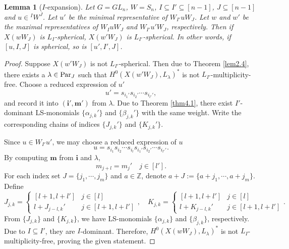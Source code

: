 \documentclass[12pt]{amsart}
\newtheorem{lemma}[theorem]{Lemma}
\theoremstyle{definition}
\theoremstyle{remark}
\newcommand{\Z}{\mathbb{Z}}
\newcommand{\Parj}{{\rm Par}_J}
\begin{document}
\begin{lemma}[$I$-expansion]\label{lem4.4}
Let $G = GL_n$, $W=S_n$, $I \subseteq I' \subseteq [n-1]$, $J \subseteq [n-1]$ and $u \in {}^I W^J$. Let $u'$ be the minimal representative of $W_{I'} u W_J$. Let $w$ and $w'$ be the maximal representatives of $W_I u W_J$ and $W_{I'} u' W_J$, respectively. Then if $X(wW_J)$ is $L_I$-spherical, $X(w'W_J)$ is $L_{I'}$-spherical. In other words, if $[u,I,J]$ is spherical, so is $[u',I',J]$.
\end{lemma}

\begin{proof}
Suppose $X(w'W_J)$ is not $L_{I'}$-spherical. Then due to Theorem \ref{lem2.4}, there exists a $\lambda \in \Parj$ such that $H^0(X(w'W_J),L_\lambda)^*$ is not $L_{I'}$-multiplicity-free. Choose a reduced expression of $u'$ 
\begin{equation}\label{eqn4.34}
u' = s_{i_1'} s_{i_2'} \cdots s_{i_{l'}'},
\end{equation}
and record it into $(\mathbf{i'}, \mathbf{m'})$ from $\lambda$. Due to Theorem \ref{thm4.1}, there exist $I'$-dominant LS-monomials $\{\alpha_{j,k}'\}$ and $\{\beta_{j,k}'\}$ with the same weight. Write the corresponding chains of indices $\{J_{j,k}'\}$ and $\{K_{j,k}'\}$.

Since $u \in W_{I'}u'$, we may choose a reduced expression of $u$
\begin{equation}\label{eqn4.35}
u = s_{i_1} s_{i_2} \cdots s_{i_l} s_{i_1'} s_{i_2 ' } \cdots s_{i_{l'}'}. 
\end{equation}
By computing $\mathbf{m}$ from $\mathbf{i}$ and $\lambda$,
\begin{equation}\label{eqn4.36}
m_{j+l} = m_j' \quad j \in [l'].
\end{equation}
For each index set $J = \{ j_1 , \cdots , j_m\}$ and $a \in \Z$, denote $a + J := \{ a+ j_1 , \cdots , a+ j_m\}$. Define
\begin{equation}\label{eqb4.37}
J_{j,k} = 
\begin{cases}
[l+1 , l+l'] & j \in [l] \\
l+J_{j-l,k}' & j \in [l+1 , l+l']
\end{cases}
, \quad K_{j,k} = 
\begin{cases}
[l+1 , l+l'] & j \in [l] \\
l+K_{j-l,k}' & j \in [l+1 , l+l']
\end{cases}
.
\end{equation}
From $\{J_{j,k}\}$ and $\{K_{j,k}\}$, we have LS-monomials $\{\alpha_{j,k}\}$ and $\{\beta_{j,k}\}$, respectively. Due to $I \subseteq I'$, they are $I$-dominant. Therefore, $H^0 (X(wW_J),L_\lambda)^*$ is not $L_I$-multiplicity-free, proving the given statement.
\end{proof}
\end{document}
